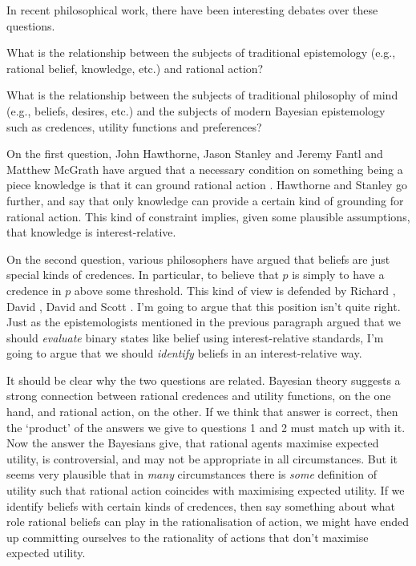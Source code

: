 In recent philosophical work, there have been interesting debates over these questions.

\begin{enumerate*}
\item What is the relationship between the subjects of traditional epistemology (e.g., rational belief, knowledge, etc.) and rational action?
\item What is the relationship between the subjects of traditional philosophy of mind (e.g., beliefs, desires, etc.) and the subjects of modern Bayesian epistemology such as credences, utility functions and preferences?
\end{enumerate*}

\noindent On the first question, John Hawthorne, Jason Stanley and Jeremy Fantl and Matthew McGrath have argued that a necessary condition on something being a piece knowledge is that it can ground rational action \citep{Hawthorne2004, Stanley2005-STAKAP,Hawthorne2008-HAWKAA,FantlMcGrath2009}. Hawthorne and Stanley go further, and say that only knowledge can provide a certain kind of grounding for rational action. This kind of constraint implies, given some plausible assumptions, that knowledge is interest-relative.

On the second question, various philosophers have argued that beliefs are just special kinds of credences. In particular, to believe that \(p\) is simply to have a credence in \(p\) above some threshold. This kind of view is defended by Richard \cite{Foley1993}, David \cite{Hunter1996}, David \cite{Christensen2005} and Scott \cite{Sturgeon2008}. I'm going to argue that this position isn't quite right. Just as the epistemologists mentioned in the previous paragraph argued that we should \textit{evaluate} binary states like belief using interest-relative standards, I'm going to argue that we should \textit{identify} beliefs in an interest-relative way.

It should be clear why the two questions are related. Bayesian theory suggests a strong connection between rational credences and utility functions, on the one hand, and rational action, on the other. If we think that answer is correct, then the `product' of the answers we give to questions 1 and 2 must match up with it. Now the answer the Bayesians give, that rational agents maximise expected utility, is controversial, and may not be appropriate in all circumstances. But it seems very plausible that in \textit{many} circumstances there is \textit{some} definition of utility such that rational action coincides with maximising expected utility. If we identify beliefs with certain kinds of credences, then say something about what role rational beliefs can play in the rationalisation of action, we might have ended up committing ourselves to the rationality of actions that don't maximise expected utility.

